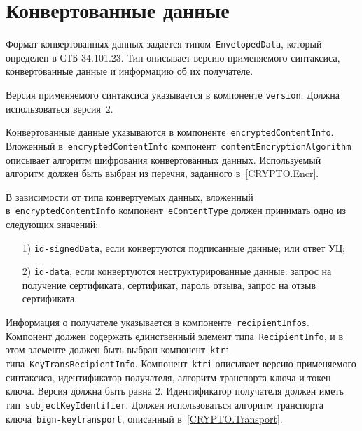 
\section{Конвертованные данные}\label{FMT.EnvelopedData}

Формат конвертованных данных задается типом~\texttt{EnvelopedData}, который
определен в СТБ 34.101.23. Тип описывает версию применяемого синтаксиса,
конвертованные данные и информацию об их получателе.

Версия применяемого синтаксиса указывается в компоненте
\texttt{version}. Должна использоваться версия~$2$.

Конвертованные данные указываются в компоненте~\texttt{encryptedContentInfo}.
%
Вложенный в~\texttt{encryptedContentInfo} компонент~\texttt{contentEncryptionAlgorithm}
описывает алгоритм шифрования конвертованных данных. Используемый алгоритм 
должен быть выбран из перечня, заданного в~\ref{CRYPTO.Encr}.

В зависимости от типа конвертуемых данных, вложенный 
в~\texttt{encryptedContentInfo} компонент~\texttt{eContentType} 
должен принимать одно из следующих значений:
\begin{enumerate}
\item[1)]
\texttt{id-signedData}, если конвертуются подписанные данные;
или ответ УЦ; 
\item[2)]
\texttt{id-data}, если конвертуются неструктурированные данные:
запрос на получение сертификата, сертификат, пароль отзыва, запрос на 
отзыв сертификата.
\end{enumerate}



Информация о получателе указывается в компоненте~\texttt{recipientInfos}.
Компонент должен содержать единственный элемент 
типа~\texttt{RecipientInfo}, и в этом элементе должен быть выбран  
компонент~\texttt{ktri} типа~\texttt{KeyTransRecipientInfo}.  
Компонент~\texttt{ktri} описывает версию применяемого синтаксиса, 
идентификатор получателя, алгоритм транспорта ключа и токен ключа. 
Версия должна быть равна 2. Идентификатор получателя должен 
иметь тип~\texttt{subjectKeyIdentifier}. Должен использоваться алгоритм 
транспорта ключа~\texttt{bign-keytransport}, описанный 
в~\ref{CRYPTO.Transport}. 

